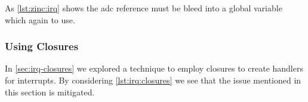 As \autoref{lst:zinc:irq} shows the adc reference must be bleed into a global variable which again {\unsafe} to use.

\subsubsection{Using Closures}

In \autoref{sec:irq-closures} we explored a technique to employ closures to create handlers for interrupts.
By considering \autoref{lst:irq:closures} we see that the issue mentioned in this section is mitigated.
